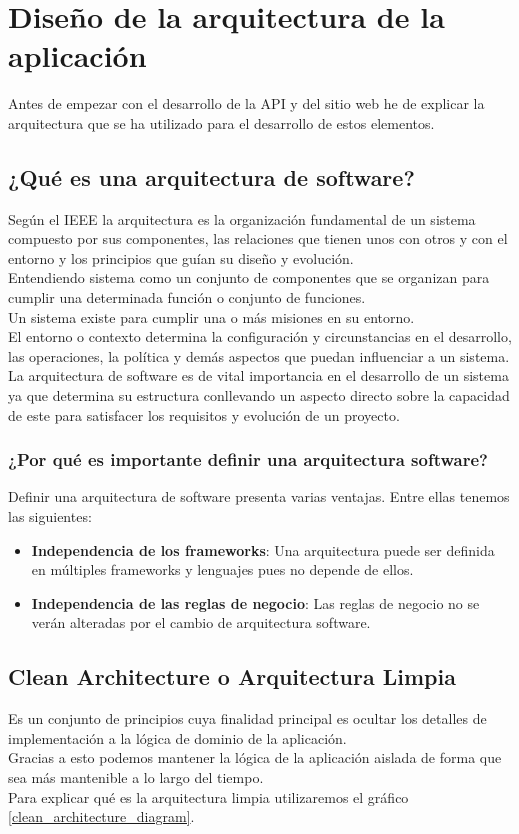 \section{Diseño de la arquitectura de la aplicación}
Antes de empezar con el desarrollo de la API y del sitio web he de explicar la arquitectura que se ha utilizado para el desarrollo de estos elementos.

\subsection{¿Qué es una arquitectura de software?}
Según el IEEE la arquitectura es la organización fundamental de un sistema compuesto por sus componentes, las relaciones que tienen unos con otros y con el entorno y los principios que guían su diseño y evolución.
\\Entendiendo sistema como un conjunto de componentes que se organizan para cumplir una determinada función o conjunto de funciones.
\\Un sistema existe para cumplir una o más misiones en su entorno.
\\El entorno o contexto determina la configuración y circunstancias en el desarrollo, las operaciones, la política y demás aspectos que puedan influenciar a un sistema.
\\La arquitectura de software es de vital importancia en el desarrollo de un sistema ya que determina su estructura conllevando un aspecto directo sobre la capacidad de este para satisfacer los requisitos y evolución de un proyecto.

\subsubsection{¿Por qué es importante definir una arquitectura software?}
Definir una arquitectura de software presenta varias ventajas. Entre ellas tenemos las siguientes:
\begin{itemize}
    \item \textbf{Independencia de los frameworks}: Una arquitectura puede ser definida en múltiples frameworks y lenguajes pues no depende de ellos.
    \item \textbf{Independencia de las reglas de negocio}: Las reglas de negocio no se verán alteradas por el cambio de arquitectura software.
\end{itemize}


\subsection{Clean Architecture o Arquitectura Limpia}
Es un conjunto de principios cuya finalidad principal es ocultar los detalles de implementación a la lógica de dominio de la aplicación.
\\Gracias a esto podemos mantener la lógica de la aplicación aislada de forma que sea más mantenible a lo largo del tiempo.
\\Para explicar qué es la arquitectura limpia utilizaremos el gráfico \ref{clean_architecture_diagram}.

